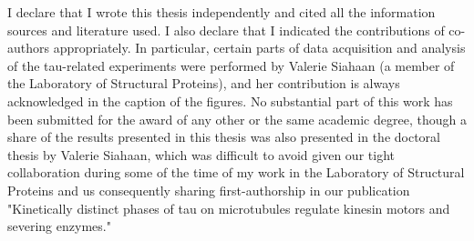 \begin{acknowledgments}
    I declare that I wrote this thesis independently and cited all the information sources and literature used. I also declare that I indicated the contributions of co-authors appropriately. In particular, certain parts of data acquisition and analysis of the tau-related experiments were performed by Valerie Siahaan (a member of the Laboratory of Structural Proteins), and her contribution is always acknowledged in the caption of the figures. No substantial part of this work has been submitted for the award of any other or the same academic degree, though a share of the results presented in this thesis was also presented in the doctoral thesis by Valerie Siahaan, which was difficult to avoid given our tight collaboration during some of the time of my work in the Laboratory of Structural Proteins and us consequently sharing first-authorship in our publication "Kinetically distinct phases of tau on microtubules regulate kinesin motors and severing enzymes."
\end{acknowledgments}